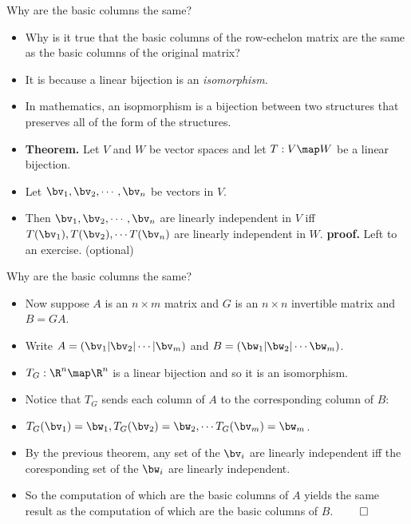 \documentclass{beamer}
\begin{document}

\begin{frame}{Why are the basic columns the same?}

\begin{itemize}
\item Why is it true that the basic columns of the row-echelon matrix are
the same as the basic columns of the original matrix?
\item It is because a linear bijection is an \emph{isomorphism.}
\item In mathematics, an isopmorphism is a bijection between two structures
that preserves all of the form of the structures.
\item \textbf{Theorem.} Let $V$ and $W$ be vector spaces and let
$T:V\map W$ be a linear bijection.
\item Let $\bv_1,\bv_2,\cdots,\bv_n$ be vectors in $V$.
\item Then $\bv_1,\bv_2,\cdots,\bv_n$ are linearly independent in $V$
iff $T(\bv_1),T(\bv_2),\cdots T(\bv_n)$ are linearly independent in $W$.
\textbf{proof.} Left to an exercise. (optional)
\end{itemize}
\end{frame}


\begin{frame}{Why are the basic columns the same?}

\begin{itemize}
\item Now suppose $A$ is an $n\times m$ matrix and $G$ is an $n\times n$ invertible matrix
and $B=GA$.
\item Write $A=(\bv_1 \vert \bv_2 \vert \cdots \vert \bv_m)$ and $B=(\bw_1 \vert \bw_2 \vert \cdots \bw_m)$.
\item $T_G:\R^n\map \R^n$ is a linear bijection and so it is an isomorphism.
\item Notice that $T_G$ sends each column of $A$ to the corresponding column of $B$:
\item $T_G(\bv_1) = \bw_1, T_G(\bv_2) = \bw_2, \cdots T_G(\bv_m) = \bw_m$.
\item By the previous theorem, any set of the $\bv_i$ are linearly independent iff the coresponding set of the $\bw_i$
are linearly independent.
\item So the computation of which are the basic columns of $A$ yields the same result as the computation of which are the basic columns of $B$. $\qed$

\end{itemize}
\end{frame}
\end{document}
